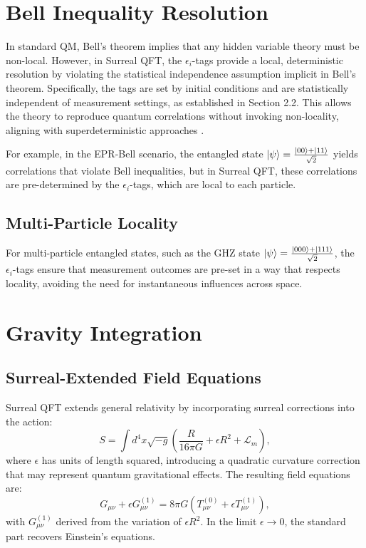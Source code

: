 \documentclass{article}
\begin{document}
\section{Bell Inequality Resolution}
In standard QM, Bell's theorem implies that any hidden variable theory must be non-local. However, in Surreal QFT, the \(\epsilon_i\)-tags provide a local, deterministic resolution by violating the statistical independence assumption implicit in Bell's theorem. Specifically, the tags are set by initial conditions and are statistically independent of measurement settings, as established in Section 2.2. This allows the theory to reproduce quantum correlations without invoking non-locality, aligning with superdeterministic approaches \cite{Hossenfelder2019}.

For example, in the EPR-Bell scenario, the entangled state \(\ket{\psi} = \frac{\ket{00} + \ket{11}}{\sqrt{2}}\) yields correlations that violate Bell inequalities, but in Surreal QFT, these correlations are pre-determined by the \(\epsilon_i\)-tags, which are local to each particle.

\subsection{Multi-Particle Locality}
For multi-particle entangled states, such as the GHZ state \(\ket{\psi} = \frac{\ket{000} + \ket{111}}{\sqrt{2}}\), the \(\epsilon_i\)-tags ensure that measurement outcomes are pre-set in a way that respects locality, avoiding the need for instantaneous influences across space.

\section{Gravity Integration}
\subsection{Surreal-Extended Field Equations}
Surreal QFT extends general relativity by incorporating surreal corrections into the action:
\begin{equation}
S = \int d^4x \sqrt{-g} \left( \frac{R}{16\pi G} + \epsilon R^2 + \mathcal{L}_m \right),
\end{equation}
where \(\epsilon\) has units of length squared, introducing a quadratic curvature correction that may represent quantum gravitational effects. The resulting field equations are:
\begin{equation}
G_{\mu\nu} + \epsilon G_{\mu\nu}^{(1)} = 8\pi G \left( T_{\mu\nu}^{(0)} + \epsilon T_{\mu\nu}^{(1)} \right),
\end{equation}
with \(G_{\mu\nu}^{(1)}\) derived from the variation of \(\epsilon R^2\). In the limit \(\epsilon \to 0\), the standard part recovers Einstein's equations.
\end{document}
